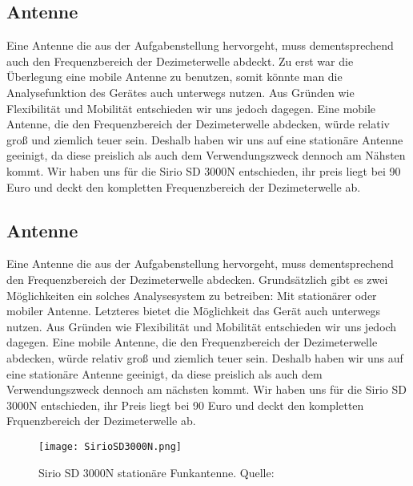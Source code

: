 \subsection{Antenne}
Eine Antenne die aus der Aufgabenstellung hervorgeht, muss dementsprechend auch den Frequenzbereich der Dezimeterwelle abdeckt. Zu erst war die Überlegung eine mobile Antenne zu benutzen, somit könnte man die Analysefunktion des Gerätes auch unterwegs nutzen. Aus Gründen wie Flexibilität und Mobilität entschieden wir uns jedoch dagegen. Eine mobile Antenne, die den Frequenzbereich der Dezimeterwelle abdecken, würde relativ groß und ziemlich teuer sein. Deshalb haben wir uns auf eine stationäre Antenne geeinigt, da diese preislich als auch dem Verwendungszweck dennoch am Nähsten kommt. Wir haben uns für die  Sirio SD 3000N entschieden, ihr preis liegt bei 90 Euro und deckt den kompletten Frequenzbereich der Dezimeterwelle ab.\newline

\subsection{Antenne} %
Eine Antenne die aus der Aufgabenstellung hervorgeht, muss dementsprechend den Frequenzbereich der Dezimeterwelle abdecken. 
Grundsätzlich gibt es zwei Möglichkeiten ein solches Analysesystem zu betreiben: Mit stationärer oder mobiler Antenne. Letzteres bietet die Möglichkeit das Gerät auch unterwegs nutzen. 
Aus Gründen wie Flexibilität und Mobilität entschieden wir uns jedoch dagegen. Eine mobile Antenne, die den Frequenzbereich der Dezimeterwelle abdecken, würde relativ groß und ziemlich teuer sein. Deshalb haben wir uns auf eine stationäre Antenne geeinigt, da diese preislich als auch dem Verwendungszweck dennoch am nächsten kommt. Wir haben uns für die  Sirio SD 3000N entschieden, ihr Preis liegt bei 90 Euro und deckt den kompletten Frquenzbereich der Dezimeterwelle ab.\newline %

\begin{figure}[ht]
	\centering
	\texttt{[image: SirioSD3000N.png]} %
	\caption[Sirio SD 3000N stationäre Funkantenne]{Sirio SD 3000N stationäre Funkantenne. Quelle: \cite{Funktechnik:2018}} 
	\label{Sirio SD 3000N Antenne}
\end{figure}

